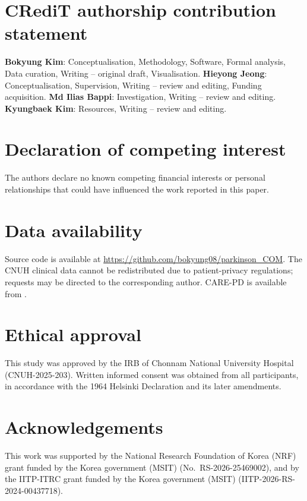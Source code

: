 \documentclass[preprint,12pt]{elsarticle}
\begin{document}
\section*{CRediT authorship contribution statement}
\textbf{Bokyung Kim}: Conceptualisation, Methodology, Software, Formal analysis,
Data curation, Writing -- original draft, Visualisation.
\textbf{Hieyong Jeong}: Conceptualisation, Supervision, Writing -- review and
editing, Funding acquisition.
\textbf{Md Ilias Bappi}: Investigation, Writing -- review and editing.
\textbf{Kyungbaek Kim}: Resources, Writing -- review and editing.

\section*{Declaration of competing interest}
The authors declare no known competing financial interests or personal
relationships that could have influenced the work reported in this paper.

\section*{Data availability}
Source code is available at
\url{https://github.com/bokyung08/parkinson_COM}. The CNUH clinical data cannot
be redistributed due to patient-privacy regulations; requests may be directed to
the corresponding author. CARE-PD is available from \cite{adeli2025carepd}.

\section*{Ethical approval}
This study was approved by the IRB of Chonnam National University Hospital
(CNUH-2025-203). Written informed consent was obtained from all participants, in
accordance with the 1964 Helsinki Declaration and its later amendments.

\section*{Acknowledgements}
This work was supported by the National Research Foundation of Korea (NRF) grant
funded by the Korea government (MSIT) (No.~RS-2026-25469002), and by the
IITP-ITRC grant funded by the Korea government (MSIT)
(IITP-2026-RS-2024-00437718).
\end{document}
